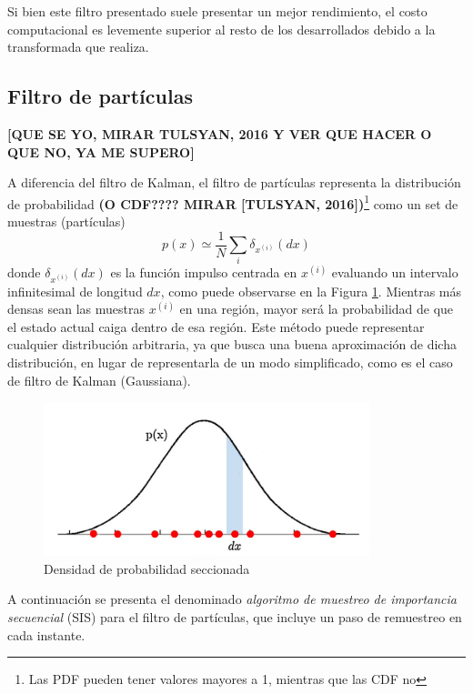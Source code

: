 Si bien este filtro presentado suele presentar un mejor rendimiento, el costo computacional es levemente superior al resto de los desarrollados debido a la transformada que realiza.

\subsection{Filtro de partículas}
\textbf{[QUE SE YO, MIRAR TULSYAN, 2016 Y VER QUE HACER O QUE NO, YA ME SUPERO]}

A diferencia del filtro de Kalman, el filtro de partículas representa la distribución de probabilidad \textbf{(O CDF???? MIRAR [TULSYAN, 2016])}\footnote{Las PDF pueden tener valores mayores a 1, mientras que las CDF no} como un set de muestras (partículas)
\begin{equation}
    p(x) \simeq \frac{1}{N} \sum_i \delta_{x^{(i)}}(dx)
\end{equation}
donde $\delta_{x^{(i)}}(dx)$ es la función impulso centrada en $x^{(i)}$ evaluando un intervalo infinitesimal de longitud $dx$, como puede observarse en la Figura \ref{fig:probabilityinfinitesimal}. Mientras más densas sean las muestras $x^{(i)}$ en una región, mayor será la probabilidad de que el estado actual caiga dentro de esa región. Este método puede representar cualquier distribución arbitraria, ya que busca una buena aproximación de dicha distribución, en lugar de representarla de un modo simplificado, como es el caso de filtro de Kalman (Gaussiana).
\begin{figure}
    \centering
    \includegraphics{Img/ProbabilityInfinitesimal.png}
    \caption{Densidad de probabilidad seccionada}
    \label{fig:probabilityinfinitesimal}
\end{figure}{}

A continuación se presenta el denominado \textit{algoritmo de muestreo de importancia secuencial} (SIS) para el filtro de partículas, que incluye un paso de remuestreo en cada instante. 

